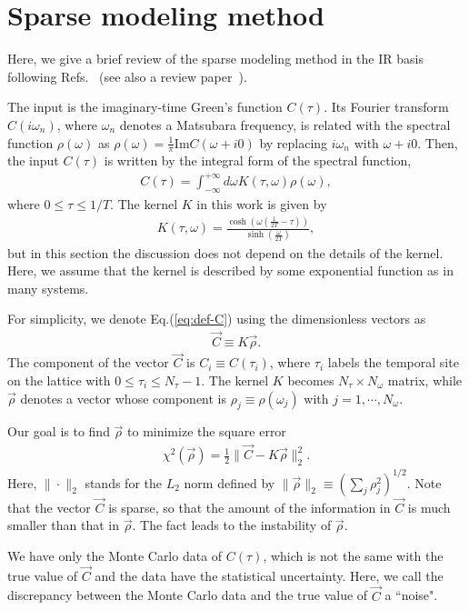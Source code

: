 \documentclass[a4paper,11pt]{article}
\newcommand\beq{ \begin{eqnarray} }
\newcommand\eeq{ \end{eqnarray} }
\begin{document}
\section{Sparse modeling method}\label{sec:sparse-modeling}
Here, we give a brief review of the sparse modeling method in the IR basis following Refs.~\cite{Shinaoka2017a, Shinaoka2017b} (see also a review paper~\cite{review-sparse}). 

The input is the imaginary-time Green's function $C(\tau)$.
Its Fourier transform $C(i \omega_n)$, where $\omega_n$ denotes a Matsubara frequency, is related with 
the spectral function $\rho(\omega)$ as $\rho(\omega)= \frac{1}{\pi} \mbox{Im} C(\omega + i 0)$ by replacing $i \omega_n$ with $\omega + i0$.
Then, the input $C(\tau)$ is written by the integral form of the spectral function,
\beq
C(\tau) = \int^{+\infty}_{-\infty} d \omega K(\tau, \omega) \rho(\omega), \label{eq:def-C}
\eeq
where $0 \le \tau \le 1/T$.
The kernel $K$ in this work is given by
\beq
K(\tau, \omega) = \frac{\cosh \left( \omega (\frac{1}{2T}-\tau) \right)}{\sinh (\frac{\omega}{2T})},
\eeq
but in this section the discussion does not depend on the details of the kernel.
Here, we assume that the kernel is described by some exponential function as in many systems.


For simplicity,  we denote Eq.(\ref{eq:def-C}) using the dimensionless vectors as
\beq
\vec{C} \equiv K \vec{\rho}. \label{eq:ckrho}
\eeq
The component of the vector $\vec{C}$ is $C_i \equiv C(\tau_i)$, where $\tau_i$ labels the temporal site on the lattice with $0 \le \tau_i \le N_\tau-1$.
The kernel $K$ becomes $N_\tau \times N_\omega$ matrix, while $\vec{\rho}$ denotes a vector whose component is $\rho_j \equiv \rho(\omega_j)$ with $j = 1, \cdots ,N_\omega$.

Our goal is to find $\vec{\rho}$ to minimize the square error
\beq
\chi^2 (\vec{\rho}) = \frac{1}{2} \| \vec{C} - K \vec{\rho}  \|^2_2.\label{eq:chi-sq}
\eeq
Here, $\| \cdot \|_2$ stands for the $L_2$ norm defined by $\| \vec{\rho} \|_2 \equiv (\sum_j \rho^2_j)^{1/2}$.
Note that the vector $\vec{C}$ is sparse, so that the amount of the information in $\vec{C}$ is much smaller than that in $\vec{\rho}$.
The fact leads to the instability of $\vec{\rho}$.

We have only the Monte Carlo data of $C(\tau)$, which is not the same with the true value of $\vec{C}$ and the data have the statistical uncertainty.
Here, we call the discrepancy between the Monte Carlo data and the true value of $\vec{C}$ a ``noise".
\end{document}
